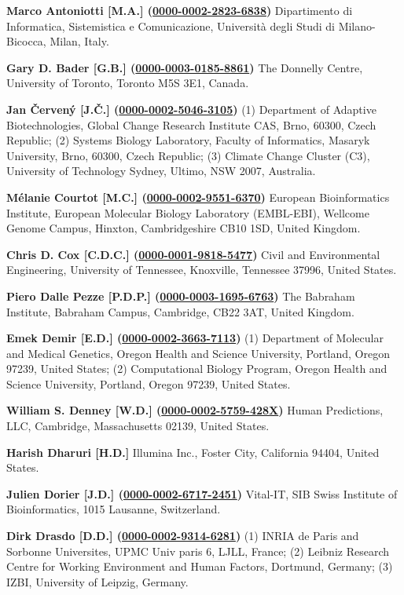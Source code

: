 \documentclass{sbml-paper}
\newcommand{\orcid}[1]{\href{https://orcid.org/#1}{#1}}
\begin{document}
\textbf{Marco Antoniotti [M.A.] (\orcid{0000-0002-2823-6838})} Dipartimento di Informatica, Sistemistica e Comunicazione, Universit\`{a} degli Studi di Milano-Bicocca, Milan, Italy.

\textbf{Gary D. Bader [G.B.] (\orcid{0000-0003-0185-8861})} The Donnelly Centre, University of Toronto, Toronto M5S 3E1, Canada.

\textbf{Jan \v{C}erven\'{y} [J.Č.] (\orcid{0000-0002-5046-3105})} (1) Department of Adaptive Biotechnologies, Global Change Research Institute CAS, Brno, 60300, Czech Republic; (2) Systems Biology Laboratory, Faculty of Informatics, Masaryk University, Brno, 60300, Czech Republic; (3) Climate Change Cluster (C3), University of Technology Sydney, Ultimo, NSW 2007, Australia.

\textbf{M\'{e}lanie Courtot [M.C.] (\orcid{0000-0002-9551-6370})} European Bioinformatics Institute, European Molecular Biology Laboratory (EMBL-EBI), Wellcome Genome Campus, Hinxton, Cambridgeshire CB10 1SD, United Kingdom.

\textbf{Chris D. Cox [C.D.C.] (\orcid{0000-0001-9818-5477})} Civil and Environmental Engineering, University of Tennessee, Knoxville, Tennessee 37996, United States.

\textbf{Piero Dalle Pezze [P.D.P.] (\orcid{0000-0003-1695-6763})} The Babraham Institute, Babraham Campus, Cambridge, CB22 3AT, United Kingdom.

\textbf{Emek Demir [E.D.] (\orcid{0000-0002-3663-7113})} (1) Department of Molecular and Medical Genetics, Oregon Health and Science University, Portland, Oregon 97239, United States; (2) Computational Biology Program, Oregon Health and Science University, Portland, Oregon 97239, United States.

\textbf{William S. Denney [W.D.] (\orcid{0000-0002-5759-428X})} Human Predictions, LLC, Cambridge, Massachusetts 02139, United States.

\textbf{Harish Dharuri [H.D.]} Illumina Inc., Foster City, California 94404, United States.

\textbf{Julien Dorier [J.D.] (\orcid{0000-0002-6717-2451})} Vital-IT, SIB Swiss Institute of Bioinformatics, 1015 Lausanne, Switzerland.

\textbf{Dirk Drasdo [D.D.] (\orcid{0000-0002-9314-6281})} (1) INRIA de Paris and Sorbonne Universites, UPMC Univ paris 6, LJLL, France; (2) Leibniz Research Centre for Working Environment and Human Factors, Dortmund, Germany; (3) IZBI, University of Leipzig, Germany.
\end{document}
